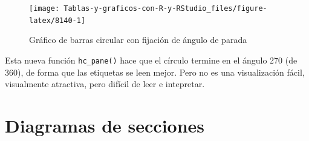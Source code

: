 \documentclass[
]{book}
\newenvironment{Shaded}{\begin{snugshade}}{\end{snugshade}}
\newcommand{\AttributeTok}[1]{\textcolor[rgb]{0.77,0.63,0.00}{#1}}
\newcommand{\ConstantTok}[1]{\textcolor[rgb]{0.00,0.00,0.00}{#1}}
\newcommand{\DecValTok}[1]{\textcolor[rgb]{0.00,0.00,0.81}{#1}}
\newcommand{\FunctionTok}[1]{\textcolor[rgb]{0.00,0.00,0.00}{#1}}
\newcommand{\NormalTok}[1]{#1}
\newcommand{\SpecialCharTok}[1]{\textcolor[rgb]{0.00,0.00,0.00}{#1}}
\newcommand{\StringTok}[1]{\textcolor[rgb]{0.31,0.60,0.02}{#1}}
\begin{document}
\begin{Shaded}
\end{Shaded}

\begin{figure}[H]

{\centering \texttt{[image: Tablas-y-graficos-con-R-y-RStudio\_files/figure-latex/8140-1]} 

}

\caption{Gráfico de barras circular con fijación de ángulo de parada}\label{fig:8140}
\end{figure}

Esta nueva función \texttt{hc\_pane()} hace que el círculo termine en el ángulo 270 (de 360), de forma que las etiquetas se leen mejor. Pero no es una visualización fácil, visualmente atractiva, pero difícil de leer e intepretar.

\hypertarget{diagramas-de-secciones}{%
\section{Diagramas de secciones}\label{diagramas-de-secciones}}
\end{document}

